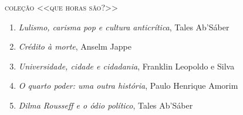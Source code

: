\medskip
{\large\textsc{coleção <<que horas são?>>}}

\begin{enumerate}
\setlength\parskip{4.2pt}
\setlength\itemsep{-1.4mm}
\item \textit{Lulismo, carisma pop e cultura anticrítica}, Tales Ab'Sáber
\item \textit{Crédito à morte}, Anselm Jappe
\item \textit{Universidade, cidade e cidadania}, Franklin Leopoldo e Silva
\item \textit{O quarto poder: uma outra história}, Paulo Henrique Amorim
\item \textit{Dilma Rousseff e o ódio político}, Tales Ab'Sáber
\end{enumerate}

\endgroup

\pagebreak
\ifodd\thepage\paginabranca\else\clearpage\fi
